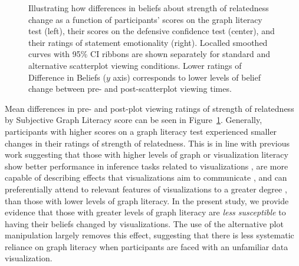\documentclass[sigconf]{acmart}
\begin{document}
\begin{figure}


\caption{\label{fig-add-analyses-plots}Illustrating how differences in
beliefs about strength of relatedness change as a function of
participants' scores on the graph literacy test (left), their scores on
the defensive confidence test (center), and their ratings of statement
emotionality (right). Localled smoothed curves with 95\% CI ribbons are
shown separately for standard and alternative scatterplot viewing
conditions. Lower ratings of Difference in Beliefs (\(y\) axis)
corresponds to lower levels of belief change between pre- and
post-scatterplot viewing times.}

\end{figure}%

Mean differences in pre- and post-plot viewing ratings of strength of
relatedness by Subjective Graph Literacy score can be seen in
Figure~\ref{fig-add-analyses-plots}. Generally, participants with higher
scores on a graph literacy test experienced smaller changes in their
ratings of strength of relatedness. This is in line with previous work
suggesting that those with higher levels of graph or visualization
literacy show better performance in inference tasks related to
visualizations \citep{canham_2010}, are more capable of describing
effects that visualizations aim to communicate \citep{shah_2011}, and
can preferentially attend to relevant features of visualizations to a
greater degree \citep{okan_2016}, than those with lower levels of graph
literacy. In the present study, we provide evidence that those with
greater levels of graph literacy are \emph{less susceptible} to having
their beliefs changed by visualizations. The use of the alternative plot
manipulation largely removes this effect, suggesting that there is less
systematic reliance on graph literacy when participants are faced with
an unfamiliar data visualization.
\end{document}
